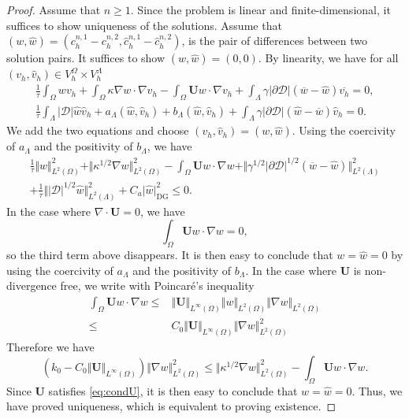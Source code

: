 \documentclass[10pt,a4paper]{amsart}
\newcommand{\DG}{\mathrm{DG}}
\newcommand{\bfU}{{\boldsymbol U}}
\begin{document}
\begin{proof}
Assume that $n\geq 1$.
Since the problem is linear and finite-dimensional, it suffices to show uniqueness of the solutions.  Assume that $(w,\hat w) = (c_h^{n,1}-c_h^{n,2}, \hat c_h^{n,1}-\hat c_h^{n,2})$, is the pair of differences between two solution pairs. It suffices to show $(w,\hat w) = (0,0)$. By linearity, we have for all $(v_h,\hat v_h)\in V_h^\Omega\times V_h^\Lambda$
    \begin{align*}
    \frac{1}{\tau}\int_\Omega w v_h
      +   \int_\Omega  \kappa \nabla w \cdot \nabla v_h  
      - \int_\Omega \bfU w \cdot \nabla v_h
      +\int_\Lambda\gamma \vert \partial\mathcal{D}\vert \left(\overline{w}-\hat{w}\right)\overline{v_h}
        = 0,\\
      \frac{1}{\tau} \int_\Lambda |\mathcal{D}|\hat w \hat v_h 
    + a_\Lambda(\hat w, \hat v_h)
    + b_\Lambda(\hat w, \hat v_h)
    +\int_\Lambda \gamma|\partial\mathcal{D}|\left(\hat w-\overline{w}\right)   \hat v_h
   =    0.
\end{align*}
We add the two equations and choose $(v_h,\hat v_h) = (w, \hat w)$. Using the coercivity of $a_\Lambda$ and the positivity of $b_\Lambda$, we have
\begin{align*}
    \frac{1}{\tau}\Vert w \Vert_{L^2(\Omega)}^2
    + \Vert \kappa^{1/2} \nabla w \Vert_{L^2(\Omega)}^2  
      - \int_\Omega \bfU w \cdot \nabla w
      +\Vert \gamma^{1/2} \vert \partial\mathcal{D} 
      \vert^{1/2}  (\overline{w}-\hat{w})\Vert_{L^2(\Lambda)}^2
    \\
      +\frac{1}{\tau} \Vert  |\mathcal{D}|^{1/2} \hat w \Vert_{L^2(\Lambda)}^2 
    + C_a \vert \hat w \vert_{\DG}^2
    \leq 0.
\end{align*}
In the case where $\nabla \cdot \bfU = 0$, we have
\[
\int_\Omega \bfU w \cdot \nabla w = 0,
\]
so the third term above disappears.  It is then easy to conclude that $w=\hat w = 0$ by using the coercivity of $a_\Lambda$ and the positivity of $b_\Lambda$.
%
In the case where $\bfU$ is non-divergence free, we 
write with Poincar\'e's inequality
\begin{align*}
\int_\Omega \bfU w \cdot \nabla w \leq & \Vert \bfU \Vert_{L^\infty(\Omega)} \Vert w \Vert_{L^2(\Omega)} \Vert \nabla w \Vert_{L^2(\Omega)}\\
\leq & C_0 \Vert \bfU \Vert_{L^\infty(\Omega)} \Vert \nabla w \Vert_{L^2(\Omega)}^2
\end{align*}
Therefore we have 
\[
(k_0 - C_0 \Vert \bfU \Vert_{L^\infty(\Omega)}) \Vert \nabla w \Vert_{L^2(\Omega)}^2 \leq 
\Vert \kappa^{1/2} \nabla w \Vert_{L^2(\Omega)}^2
- \int_\Omega \bfU w \cdot \nabla w.
\]
Since $\bfU$ satisfies \eqref{eq:condU},
it is then easy to conclude that $w = \hat w  = 0$. Thus, we have proved uniqueness, which is equivalent to proving existence.


\end{proof}
\end{document}
